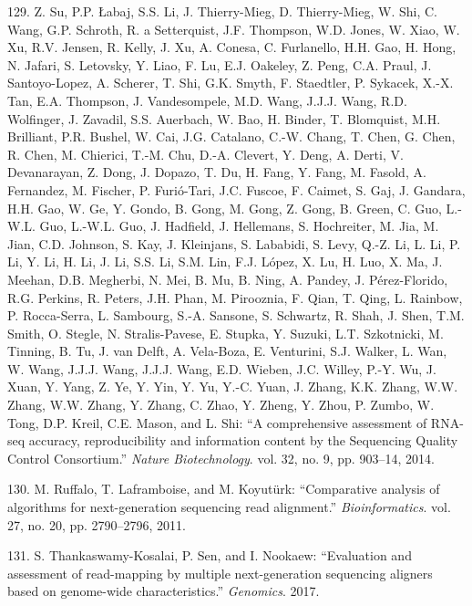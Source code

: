 \documentclass[12pt,twoside]{ugathesis}
\theoremstyle{definition}
\theoremstyle{definition}
\theoremstyle{remark}
\begin{document}
\hypertarget{ref-Su2014}{}
129. Z. Su, P.P. Łabaj, S.S. Li, J. Thierry-Mieg, D. Thierry-Mieg, W.
Shi, C. Wang, G.P. Schroth, R. a Setterquist, J.F. Thompson, W.D. Jones,
W. Xiao, W. Xu, R.V. Jensen, R. Kelly, J. Xu, A. Conesa, C. Furlanello,
H.H. Gao, H. Hong, N. Jafari, S. Letovsky, Y. Liao, F. Lu, E.J. Oakeley,
Z. Peng, C.A. Praul, J. Santoyo-Lopez, A. Scherer, T. Shi, G.K. Smyth,
F. Staedtler, P. Sykacek, X.-X. Tan, E.A. Thompson, J. Vandesompele,
M.D. Wang, J.J.J. Wang, R.D. Wolfinger, J. Zavadil, S.S. Auerbach, W.
Bao, H. Binder, T. Blomquist, M.H. Brilliant, P.R. Bushel, W. Cai, J.G.
Catalano, C.-W. Chang, T. Chen, G. Chen, R. Chen, M. Chierici, T.-M.
Chu, D.-A. Clevert, Y. Deng, A. Derti, V. Devanarayan, Z. Dong, J.
Dopazo, T. Du, H. Fang, Y. Fang, M. Fasold, A. Fernandez, M. Fischer, P.
Furió-Tari, J.C. Fuscoe, F. Caimet, S. Gaj, J. Gandara, H.H. Gao, W. Ge,
Y. Gondo, B. Gong, M. Gong, Z. Gong, B. Green, C. Guo, L.-W.L. Guo,
L.-W.L. Guo, J. Hadfield, J. Hellemans, S. Hochreiter, M. Jia, M. Jian,
C.D. Johnson, S. Kay, J. Kleinjans, S. Lababidi, S. Levy, Q.-Z. Li, L.
Li, P. Li, Y. Li, H. Li, J. Li, S.S. Li, S.M. Lin, F.J. López, X. Lu, H.
Luo, X. Ma, J. Meehan, D.B. Megherbi, N. Mei, B. Mu, B. Ning, A. Pandey,
J. Pérez-Florido, R.G. Perkins, R. Peters, J.H. Phan, M. Pirooznia, F.
Qian, T. Qing, L. Rainbow, P. Rocca-Serra, L. Sambourg, S.-A. Sansone,
S. Schwartz, R. Shah, J. Shen, T.M. Smith, O. Stegle, N. Stralis-Pavese,
E. Stupka, Y. Suzuki, L.T. Szkotnicki, M. Tinning, B. Tu, J. van Delft,
A. Vela-Boza, E. Venturini, S.J. Walker, L. Wan, W. Wang, J.J.J. Wang,
J.J.J. Wang, E.D. Wieben, J.C. Willey, P.-Y. Wu, J. Xuan, Y. Yang, Z.
Ye, Y. Yin, Y. Yu, Y.-C. Yuan, J. Zhang, K.K. Zhang, W.W. Zhang, W.W.
Zhang, Y. Zhang, C. Zhao, Y. Zheng, Y. Zhou, P. Zumbo, W. Tong, D.P.
Kreil, C.E. Mason, and L. Shi: ``A comprehensive assessment of RNA-seq
accuracy, reproducibility and information content by the Sequencing
Quality Control Consortium.'' \emph{Nature Biotechnology}. vol. 32, no.
9, pp. 903--14, 2014.

\hypertarget{ref-Ruffalo2011}{}
130. M. Ruffalo, T. Laframboise, and M. Koyutürk: ``Comparative analysis
of algorithms for next-generation sequencing read alignment.''
\emph{Bioinformatics}. vol. 27, no. 20, pp. 2790--2796, 2011.

\hypertarget{ref-Thankaswamy-Kosalai2017}{}
131. S. Thankaswamy-Kosalai, P. Sen, and I. Nookaew: ``Evaluation and
assessment of read-mapping by multiple next-generation sequencing
aligners based on genome-wide characteristics.'' \emph{Genomics}. 2017.
\end{document}
